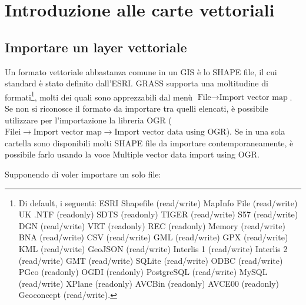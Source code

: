 \chapter{Introduzione alle carte vettoriali}

\section{Importare un layer vettoriale}
	Un formato vettoriale abbastanza comune in un GIS è lo SHAPE file, il cui standard è stato definito dall'ESRI. GRASS supporta una moltitudine di formati\footnote{Di default, i seguenti: ESRI Shapefile (read/write) MapInfo File (read/write) UK .NTF (readonly) SDTS (readonly) TIGER (read/write) S57 (read/write) DGN (read/write) VRT (readonly) REC (readonly) Memory (read/write) BNA (read/write) CSV (read/write) GML (read/write) GPX (read/write) KML (read/write) GeoJSON (read/write) Interlis 1 (read/write) Interlis 2 (read/write) GMT (read/write) SQLite (read/write) ODBC (read/write) PGeo (readonly) OGDI (readonly) PostgreSQL (read/write) MySQL (read/write) XPlane (readonly) AVCBin (readonly) AVCE00 (readonly) Geoconcept (read/write).}, molti dei quali sono apprezzabili dal menù \textsf{$\text{File}\rightarrow\text{Import vector map}$}. Se non si riconosce il formato da importare tra quelli elencati, è possibile utilizzare per l'importazione la libreria OGR (\textsf{$\text{Filei}\rightarrow\text{Import~vector~map}\rightarrow\text{Import~vector~data~using~OGR}$}).
	Se in una sola cartella sono disponibili molti SHAPE file da importare contemporaneamente, è possibile farlo usando la voce \textsf{Multiple vector data import using OGR}.

	Supponendo di voler importare un solo file:
	
